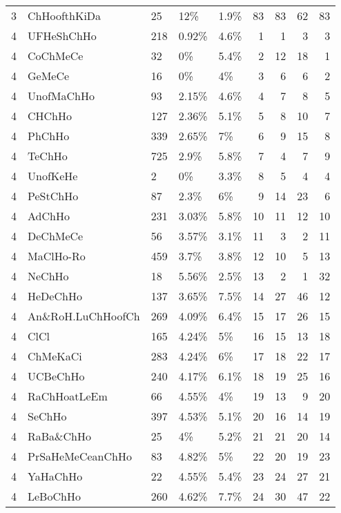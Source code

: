 \begin{longtable}{lllllrrrr}
  3 & ChHoofthKiDa & 25 & 12\% & 1.9\% &  83 &  83 &  62 &  83 \\ 
  4 & UFHeShChHo & 218 & 0.92\% & 4.6\% &   1 &   1 &   3 &   3 \\ 
  4 & CoChMeCe & 32 & 0\% & 5.4\% &   2 &  12 &  18 &   1 \\ 
  4 & GeMeCe & 16 & 0\% & 4\% &   3 &   6 &   6 &   2 \\ 
  4 & UnofMaChHo & 93 & 2.15\% & 4.6\% &   4 &   7 &   8 &   5 \\ 
  4 & CHChHo & 127 & 2.36\% & 5.1\% &   5 &   8 &  10 &   7 \\ 
  4 & PhChHo & 339 & 2.65\% & 7\% &   6 &   9 &  15 &   8 \\ 
  4 & TeChHo & 725 & 2.9\% & 5.8\% &   7 &   4 &   7 &   9 \\ 
  4 & UnofKeHe & 2 & 0\% & 3.3\% &   8 &   5 &   4 &   4 \\ 
  4 & PeStChHo & 87 & 2.3\% & 6\% &   9 &  14 &  23 &   6 \\ 
  4 & AdChHo & 231 & 3.03\% & 5.8\% &  10 &  11 &  12 &  10 \\ 
  4 & DeChMeCe & 56 & 3.57\% & 3.1\% &  11 &   3 &   2 &  11 \\ 
  4 & MaClHo-Ro & 459 & 3.7\% & 3.8\% &  12 &  10 &   5 &  13 \\ 
  4 & NeChHo & 18 & 5.56\% & 2.5\% &  13 &   2 &   1 &  32 \\ 
  4 & HeDeChHo & 137 & 3.65\% & 7.5\% &  14 &  27 &  46 &  12 \\ 
  4 & An\&RoH.LuChHoofCh & 269 & 4.09\% & 6.4\% &  15 &  17 &  26 &  15 \\ 
  4 & ClCl & 165 & 4.24\% & 5\% &  16 &  15 &  13 &  18 \\ 
  4 & ChMeKaCi & 283 & 4.24\% & 6\% &  17 &  18 &  22 &  17 \\ 
  4 & UCBeChHo & 240 & 4.17\% & 6.1\% &  18 &  19 &  25 &  16 \\ 
  4 & RaChHoatLeEm & 66 & 4.55\% & 4\% &  19 &  13 &   9 &  20 \\ 
  4 & SeChHo & 397 & 4.53\% & 5.1\% &  20 &  16 &  14 &  19 \\ 
  4 & RaBa\&ChHo & 25 & 4\% & 5.2\% &  21 &  21 &  20 &  14 \\ 
  4 & PrSaHeMeCeanChHo & 83 & 4.82\% & 5\% &  22 &  20 &  19 &  23 \\ 
  4 & YaHaChHo & 22 & 4.55\% & 5.4\% &  23 &  24 &  27 &  21 \\ 
  4 & LeBoChHo & 260 & 4.62\% & 7.7\% &  24 &  30 &  47 &  22 \\ 

\end{longtable}
